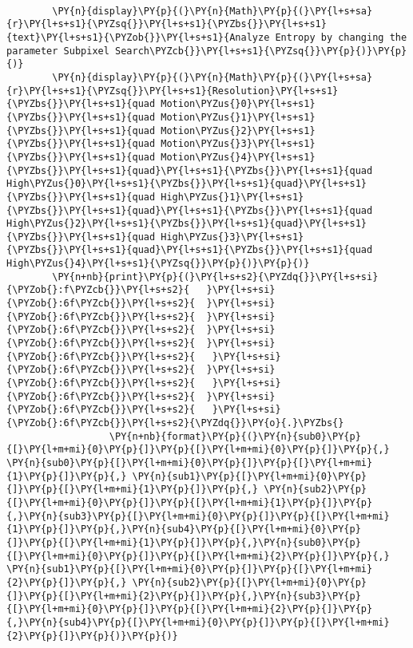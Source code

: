 {\begin{enumerate}
\begin{Verbatim}[commandchars=\\\{\}]
        
        \PY{n}{display}\PY{p}{(}\PY{n}{Math}\PY{p}{(}\PY{l+s+sa}{r}\PY{l+s+s1}{\PYZsq{}}\PY{l+s+s1}{\PYZbs{}}\PY{l+s+s1}{text}\PY{l+s+s1}{\PYZob{}}\PY{l+s+s1}{Analyze Entropy by changing the parameter Subpixel Search\PYZcb{}}\PY{l+s+s1}{\PYZsq{}}\PY{p}{)}\PY{p}{)}
        \PY{n}{display}\PY{p}{(}\PY{n}{Math}\PY{p}{(}\PY{l+s+sa}{r}\PY{l+s+s1}{\PYZsq{}}\PY{l+s+s1}{Resolution}\PY{l+s+s1}{\PYZbs{}}\PY{l+s+s1}{quad Motion\PYZus{}0}\PY{l+s+s1}{\PYZbs{}}\PY{l+s+s1}{quad Motion\PYZus{}1}\PY{l+s+s1}{\PYZbs{}}\PY{l+s+s1}{quad Motion\PYZus{}2}\PY{l+s+s1}{\PYZbs{}}\PY{l+s+s1}{quad Motion\PYZus{}3}\PY{l+s+s1}{\PYZbs{}}\PY{l+s+s1}{quad Motion\PYZus{}4}\PY{l+s+s1}{\PYZbs{}}\PY{l+s+s1}{quad}\PY{l+s+s1}{\PYZbs{}}\PY{l+s+s1}{quad  High\PYZus{}0}\PY{l+s+s1}{\PYZbs{}}\PY{l+s+s1}{quad}\PY{l+s+s1}{\PYZbs{}}\PY{l+s+s1}{quad High\PYZus{}1}\PY{l+s+s1}{\PYZbs{}}\PY{l+s+s1}{quad}\PY{l+s+s1}{\PYZbs{}}\PY{l+s+s1}{quad High\PYZus{}2}\PY{l+s+s1}{\PYZbs{}}\PY{l+s+s1}{quad}\PY{l+s+s1}{\PYZbs{}}\PY{l+s+s1}{quad High\PYZus{}3}\PY{l+s+s1}{\PYZbs{}}\PY{l+s+s1}{quad}\PY{l+s+s1}{\PYZbs{}}\PY{l+s+s1}{quad High\PYZus{}4}\PY{l+s+s1}{\PYZsq{}}\PY{p}{)}\PY{p}{)}
        \PY{n+nb}{print}\PY{p}{(}\PY{l+s+s2}{\PYZdq{}}\PY{l+s+si}{\PYZob{}:f\PYZcb{}}\PY{l+s+s2}{   }\PY{l+s+si}{\PYZob{}:6f\PYZcb{}}\PY{l+s+s2}{  }\PY{l+s+si}{\PYZob{}:6f\PYZcb{}}\PY{l+s+s2}{  }\PY{l+s+si}{\PYZob{}:6f\PYZcb{}}\PY{l+s+s2}{  }\PY{l+s+si}{\PYZob{}:6f\PYZcb{}}\PY{l+s+s2}{  }\PY{l+s+si}{\PYZob{}:6f\PYZcb{}}\PY{l+s+s2}{   }\PY{l+s+si}{\PYZob{}:6f\PYZcb{}}\PY{l+s+s2}{  }\PY{l+s+si}{\PYZob{}:6f\PYZcb{}}\PY{l+s+s2}{   }\PY{l+s+si}{\PYZob{}:6f\PYZcb{}}\PY{l+s+s2}{  }\PY{l+s+si}{\PYZob{}:6f\PYZcb{}}\PY{l+s+s2}{   }\PY{l+s+si}{\PYZob{}:6f\PYZcb{}}\PY{l+s+s2}{\PYZdq{}}\PY{o}{.}\PYZbs{}
                  \PY{n+nb}{format}\PY{p}{(}\PY{n}{sub0}\PY{p}{[}\PY{l+m+mi}{0}\PY{p}{]}\PY{p}{[}\PY{l+m+mi}{0}\PY{p}{]}\PY{p}{,} \PY{n}{sub0}\PY{p}{[}\PY{l+m+mi}{0}\PY{p}{]}\PY{p}{[}\PY{l+m+mi}{1}\PY{p}{]}\PY{p}{,} \PY{n}{sub1}\PY{p}{[}\PY{l+m+mi}{0}\PY{p}{]}\PY{p}{[}\PY{l+m+mi}{1}\PY{p}{]}\PY{p}{,} \PY{n}{sub2}\PY{p}{[}\PY{l+m+mi}{0}\PY{p}{]}\PY{p}{[}\PY{l+m+mi}{1}\PY{p}{]}\PY{p}{,}\PY{n}{sub3}\PY{p}{[}\PY{l+m+mi}{0}\PY{p}{]}\PY{p}{[}\PY{l+m+mi}{1}\PY{p}{]}\PY{p}{,}\PY{n}{sub4}\PY{p}{[}\PY{l+m+mi}{0}\PY{p}{]}\PY{p}{[}\PY{l+m+mi}{1}\PY{p}{]}\PY{p}{,}\PY{n}{sub0}\PY{p}{[}\PY{l+m+mi}{0}\PY{p}{]}\PY{p}{[}\PY{l+m+mi}{2}\PY{p}{]}\PY{p}{,} \PY{n}{sub1}\PY{p}{[}\PY{l+m+mi}{0}\PY{p}{]}\PY{p}{[}\PY{l+m+mi}{2}\PY{p}{]}\PY{p}{,} \PY{n}{sub2}\PY{p}{[}\PY{l+m+mi}{0}\PY{p}{]}\PY{p}{[}\PY{l+m+mi}{2}\PY{p}{]}\PY{p}{,}\PY{n}{sub3}\PY{p}{[}\PY{l+m+mi}{0}\PY{p}{]}\PY{p}{[}\PY{l+m+mi}{2}\PY{p}{]}\PY{p}{,}\PY{n}{sub4}\PY{p}{[}\PY{l+m+mi}{0}\PY{p}{]}\PY{p}{[}\PY{l+m+mi}{2}\PY{p}{]}\PY{p}{)}\PY{p}{)}
        

\end{Verbatim}
\end{enumerate}}
